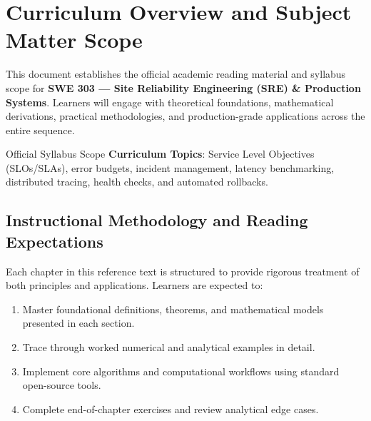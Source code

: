 \section{Curriculum Overview and Subject Matter Scope}

This document establishes the official academic reading material and syllabus scope for \textbf{SWE 303 --- Site Reliability Engineering (SRE) \& Production Systems}. Learners will engage with theoretical foundations, mathematical derivations, practical methodologies, and production-grade applications across the entire sequence.

\begin{InsightBox}{Official Syllabus Scope}
  \textbf{Curriculum Topics}: Service Level Objectives (SLOs/SLAs), error budgets, incident management, latency benchmarking, distributed tracing, health checks, and automated rollbacks.
\end{InsightBox}

\subsection{Instructional Methodology and Reading Expectations}

Each chapter in this reference text is structured to provide rigorous treatment of both principles and applications. Learners are expected to:
\begin{enumerate}
  \item Master foundational definitions, theorems, and mathematical models presented in each section.
  \item Trace through worked numerical and analytical examples in detail.
  \item Implement core algorithms and computational workflows using standard open-source tools.
  \item Complete end-of-chapter exercises and review analytical edge cases.
\end{enumerate}

